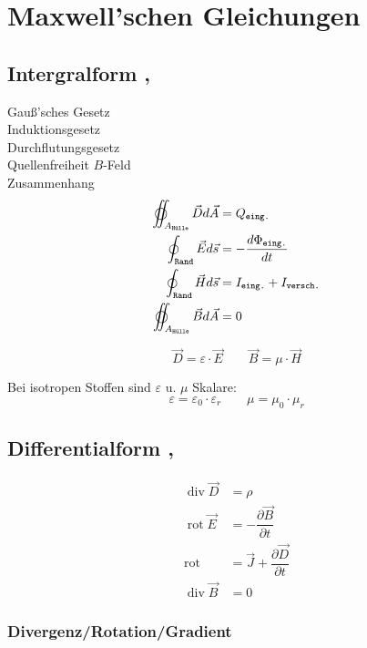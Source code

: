 \section{Maxwell’schen Gleichungen}

\subsection{Intergralform , }
Gauß'sches Gesetz\\
Induktionsgesetz\\
Durchflutungsgesetz\\
Quellenfreiheit $B$-Feld\\
Zusammenhang
\begin{align*}
    \varoiint_{A_\texttt{Hülle}} \vec{D} d \vec{A} & = Q_\texttt{eing.}                      \\
    \oint_\texttt{Rand} \vec{E} d \vec{s}          & = -\dfrac{d\Phi_\texttt{eing.}}{dt}     \\
    \oint_\texttt{Rand} \vec{H} d \vec{s}          & = I_\texttt{eing.} + I_\texttt{versch.} \\
    \varoiint_{A_\texttt{Hülle}} \vec{B} d \vec{A} & = 0
\end{align*}

\[
    \vec{D} = \varepsilon \cdot \vec{E} \qquad
    \vec{B} = \mu \cdot \vec{H}
\]

Bei isotropen Stoffen sind $\varepsilon$ u. $\mu$ Skalare:
\[
    \varepsilon = \varepsilon_0 \cdot \varepsilon_r \qquad \mu = \mu_0 \cdot \mu_r
\]

\subsection{Differentialform , }
\begin{align*}
    \operatorname{div} \vec{D} & = \rho                                           \\
    \operatorname{rot} \vec{E} & = -\dfrac{\partial \vec{B}}{\partial t}          \\
    \operatorname{rot} \quad   & = \vec{J} + \dfrac{\partial \vec{D}}{\partial t} \\
    \operatorname{div} \vec{B} & = 0
\end{align*}

\subsubsection*{Divergenz/Rotation/Gradient}

